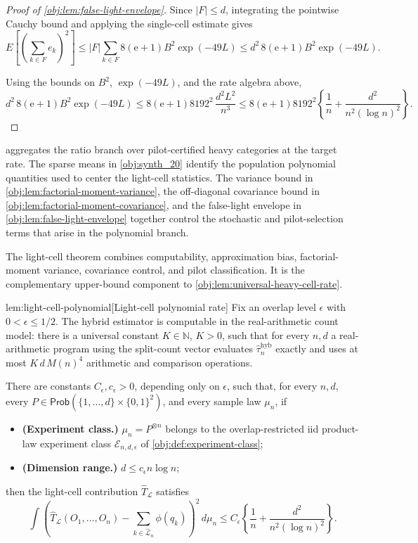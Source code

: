 \documentclass[11pt]{article}
\begin{document}
\begin{proof}[Proof of \cref{obj:lem:false-light-envelope}]
Since \(|F|\le d\), integrating the pointwise Cauchy bound and applying the single-cell estimate gives
\[
E\!\left[
\left(\sum_{k\in F}e_k\right)^2
\right]
\le
|F|\sum_{k\in F}8(\mathrm e+1)B^2\exp(-49L)
\le
d^2\,8(\mathrm e+1)B^2\exp(-49L).
\]

Using the bounds on \(B^2\), \(\exp(-49L)\), and the rate algebra above,
\[
d^2\,8(\mathrm e+1)B^2\exp(-49L)
\le
8(\mathrm e+1)8192^2\,\frac{d^2L^2}{n^3}
\le
8(\mathrm e+1)8192^2
\left\{
\frac1n+\frac{d^2}{n^2(\log n)^2}
\right\}.
\]
\end{proof}

 aggregates the ratio branch over pilot-certified heavy categories at the target rate. The sparse means in \cref{obj:synth_20} identify the population polynomial quantities used to center the light-cell statistics. The variance bound in \cref{obj:lem:factorial-moment-variance}, the off-diagonal covariance bound in \cref{obj:lem:factorial-moment-covariance}, and the false-light envelope in \cref{obj:lem:false-light-envelope} together control the stochastic and pilot-selection terms that arise in the polynomial branch.

The light-cell theorem combines computability, approximation bias, factorial-moment variance, covariance control, and pilot classification. It is the complementary upper-bound component to \cref{obj:lem:universal-heavy-cell-rate}.

\begin{lemmav}{lem:light-cell-polynomial}[Light-cell polynomial rate]
Fix an overlap level \(\epsilon\) with \(0<\epsilon\le 1/2\). The hybrid estimator is computable in the real-arithmetic count model: there is a universal constant \(K\in\mathbb N\), \(K>0\), such that for every \(n,d\) a real-arithmetic program using the split-count vector evaluates \(\widehat\tau_n^{\mathrm{hyb}}\) exactly and uses at most \(K\,d\,M(n)^4\) arithmetic and comparison operations.

There are constants \(C_\epsilon,c_\epsilon>0\), depending only on \(\epsilon\), such that, for every \(n,d\), every \(P\in\mathsf{Prob}(\{1,\ldots,d\}\times\{0,1\}^2)\), and every sample law \(\mu_n\), if
\begin{itemize}
\item \textbf{(Experiment class.)} \(\mu_n=P^{\otimes n}\) belongs to the overlap-restricted iid product-law experiment class \(\mathcal E_{n,d,\epsilon}\) of \cref{obj:def:experiment-class};
\item \textbf{(Dimension range.)} \(d\le c_\epsilon n\log n\);
\end{itemize}
then the light-cell contribution \(\widehat T_{\mathcal L}\) satisfies
\[
\int\left(\widehat T_{\mathcal L}(O_1,\ldots,O_n)
-\sum_{k\in\widehat{\mathcal L}_n}\phi(q_k)\right)^2\,d\mu_n
\le
C_\epsilon\left\{\frac1n+\frac{d^2}{n^2(\log n)^2}\right\}.
\]
\end{lemmav}
\end{document}
